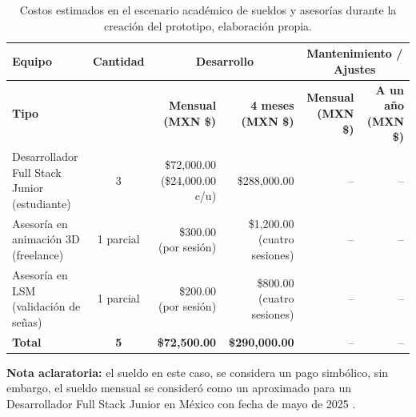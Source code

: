 \begin{table}[H]
	\centering
	\renewcommand{\arraystretch}{1.6}
	\setlength{\tabcolsep}{10pt}
	\Huge
	\begin{adjustbox}{max width=\textwidth}
		\begin{tabular}{|p{5.5cm}|c|r|r|r|r|}
			\hline
			\textbf{Equipo} & \textbf{Cantidad} & \multicolumn{2}{c|}{\textbf{Desarrollo}} & \multicolumn{2}{c|}{\textbf{Mantenimiento / Ajustes}} \\ \hline
			\textbf{Tipo} & & \textbf{Mensual (MXN \$)} & \textbf{4 meses (MXN \$)} & \textbf{Mensual (MXN \$)} & \textbf{A un año (MXN \$)} \\ \hline
			Desarrollador Full Stack Junior (estudiante) & 3 & \$72,000.00 (\$24,000.00 c/u) & \$288,000.00 & -- & -- \\ \hline
			Asesoría en animación 3D (freelance) & 1 parcial & \$300.00 (por sesión) & \$1,200.00 (cuatro sesiones) & -- & -- \\ \hline
			Asesoría en LSM (validación de señas) & 1 parcial & \$200.00 (por sesión) & \$800.00 (cuatro sesiones) & -- & -- \\ \hline
			\textbf{Total} & \textbf{5} & \textbf{\$72,500.00} & \textbf{\$290,000.00} & -- & -- \\ \hline
		\end{tabular}
	\end{adjustbox}
	\caption[Costos estimados en el escenario académico de sueldos y asesorías durante la creación del prototipo]{Costos estimados en el escenario académico de sueldos y asesorías durante la creación del prototipo, elaboración propia.}
	\label{tab:sueldos_asesorias}
\end{table}


\noindent \textbf{Nota aclaratoria:}  
el sueldo en este caso, se considera un pago simbólico, sin embargo, el sueldo mensual se consideró como un aproximado para un Desarrollador Full Stack Junior en México con fecha de mayo de 2025 \cite{ref63}.  

